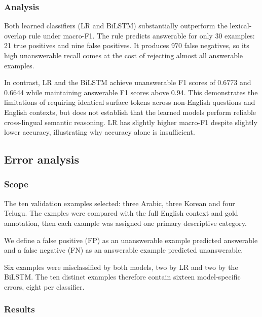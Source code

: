 \documentclass[11pt]{article}
\begin{document}
\subsubsection*{Analysis}

\noindent
Both learned classifiers (LR and BiLSTM) substantially outperform the
lexical-overlap rule under macro-F1. The rule predicts answerable for only 30 examples: 21 true positives and nine false positives. It produces 970 false negatives, so its high unanswerable recall comes at the cost of rejecting almost all answerable examples.

\noindent
In contrast, LR and the BiLSTM achieve unanswerable F1 scores of 0.6773 and 0.6644 while maintaining answerable F1 scores above 0.94. This demonstrates the limitations of requiring identical surface tokens across non-English questions and English contexts, but does not establish that the learned models perform reliable cross-lingual semantic reasoning. LR has slightly higher macro-F1 despite slightly lower accuracy, illustrating why accuracy alone is insufficient.

\subsection*{Error analysis}

\subsubsection*{Scope}

\noindent
The ten validation examples selected: three Arabic, three Korean and four Telugu. The exmples were compared with the full English context and gold annotation, then each example was assigned one primary descriptive category.

\noindent
We define a false positive (FP) as an unanswerable example predicted answerable and a false negative (FN) as an answerable example predicted unanswerable.

\noindent
Six examples were misclassified by both models, two by LR and two by the BiLSTM. The ten distinct examples therefore contain sixteen model-specific errors, eight per classifier.

\subsubsection*{Results}
\end{document}
